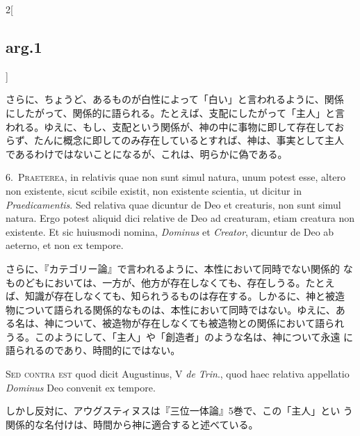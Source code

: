 \documentclass[paper=a4paper,fontsize=10pt,jafontsize=9pt,titlepage]{jlreq}
\begin{document}
\begin{paracol}{2}[\subsection{arg.1}]
\switchcolumn

さらに、ちょうど、あるものが白性によって「白い」と言われるように、関係
にしたがって、関係的に語られる。たとえば、支配にしたがって「主人」と言
われる。ゆえに、もし、支配という関係が、神の中に事物に即して存在してお
らず、たんに概念に即してのみ存在しているとすれば、神は、事実として主人
であるわけではないことになるが、これは、明らかに偽である。


6.~{\scshape Praeterea}, in relativis quae non sunt simul natura, unum
potest esse, altero non existente, sicut scibile existit, non
existente scientia, ut dicitur in {\itshape Praedicamentis}. Sed
relativa quae dicuntur de Deo et creaturis, non sunt simul
natura. Ergo potest aliquid dici relative de Deo ad creaturam, etiam
creatura non existente. Et sic huiusmodi nomina, {\itshape Dominus} et
{\itshape Creator}, dicuntur de Deo ab aeterno, et non ex tempore.

\switchcolumn

さらに、『カテゴリー論』で言われるように、本性において同時でない関係的
なものどもにおいては、一方が、他方が存在しなくても、存在しうる。たとえ
ば、知識が存在しなくても、知られうるものは存在する。しかるに、神と被造
物について語られる関係的なものは、本性において同時ではない。ゆえに、あ
る名は、神について、被造物が存在しなくても被造物との関係において語られ
うる。このようにして、「主人」や「創造者」のような名は、神について永遠
に語られるのであり、時間的にではない。

\switchcolumn*[\subsection{s.c.}]

{\scshape Sed contra est} quod dicit Augustinus, V {\itshape de
Trin}., quod haec relativa appellatio {\itshape Dominus} Deo convenit
ex tempore.

\switchcolumn

しかし反対に、アウグスティヌスは『三位一体論』5巻で、この「主人」とい
う関係的な名付けは、時間から神に適合すると述べている。



\end{paracol}
\end{document}
